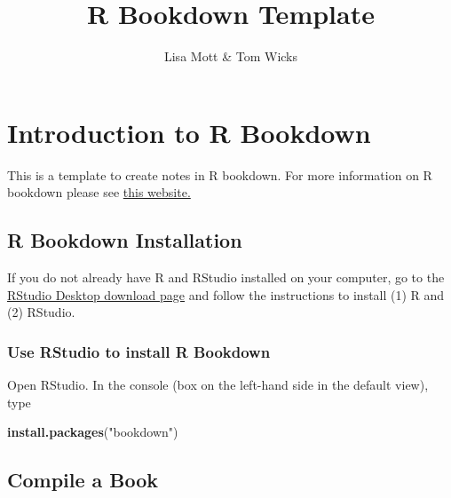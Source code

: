 \documentclass[
]{article}
\title{R Bookdown Template}
\author{Lisa Mott \& Tom Wicks}
\date{}
\newenvironment{Shaded}{\begin{snugshade}}{\end{snugshade}}
\newcommand{\FunctionTok}[1]{\textcolor[rgb]{0.13,0.29,0.53}{\textbf{#1}}}
\newcommand{\NormalTok}[1]{#1}
\newcommand{\StringTok}[1]{\textcolor[rgb]{0.31,0.60,0.02}{#1}}
\numberwithin{equation}{section}
\numberwithin{figure}{section}
\theoremstyle{break}
\theoremstyle{definition}
\theoremstyle{definition}
\theoremstyle{definition}
\theoremstyle{definition}
\theoremstyle{remark}
\begin{document}
\maketitle

{
\setcounter{tocdepth}{2}
\tableofcontents
}
\newcommand{\rd}{\mathrm{d}}
\newcommand{\deriv}[2]{\frac{\rd #1}{\rd #2}}
\newcommand{\nthderiv}[3]{\frac{\rd^#3 #1}{\rd #2}}

\hypertarget{introduction-to-r-bookdown}{%
\section{Introduction to R Bookdown}\label{introduction-to-r-bookdown}}

This is a template to create notes in R bookdown. For more information on R bookdown please see \href{https://bookdown.org/yihui/bookdown/?target=_blank}{this website.}

\hypertarget{r-bookdown-installation}{%
\subsection{R Bookdown Installation}\label{r-bookdown-installation}}

If you do not already have R and RStudio installed on your computer, go to the \href{https://posit.co/download/rstudio-desktop/?target=_blank}{RStudio Desktop download page} and follow the instructions to install (1) R and (2) RStudio.

\hypertarget{use-rstudio-to-install-r-bookdown}{%
\subsubsection*{Use RStudio to install R Bookdown}\label{use-rstudio-to-install-r-bookdown}}

Open RStudio. In the console (box on the left-hand side in the default view), type

\begin{Shaded}
\begin{Highlighting}[]
\FunctionTok{install.packages}\NormalTok{(}\StringTok{"bookdown"}\NormalTok{)}
\end{Highlighting}
\end{Shaded}

\hypertarget{compile-a-book}{%
\subsection{Compile a Book}\label{compile-a-book}}
\end{document}
